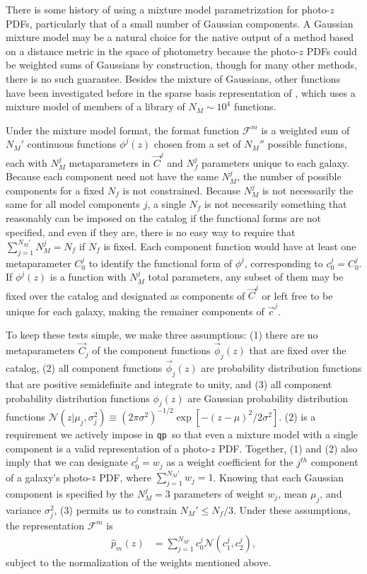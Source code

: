 \documentclass[\docopts]{\docclass}
\newcommand{\qp}{\texttt{qp}}
\newcommand{\pz}{photo-$z$ PDF}
\begin{document}
There is some history of using a mixture model parametrization for \pz s, 
particularly that of a small number of Gaussian components.
A Gaussian mixture model may be a natural choice for the native output of a 
method based on a distance metric in the space of photometry because the \pz s 
could be weighted sums of Gaussians by construction, though for many other 
methods, there is no such guarantee.  Besides the mixture of Gaussians, other 
functions have been investigated before in the sparse basis representation of 
\citet{carrasco_kind_sparse_2014}, which uses a mixture model of members of a 
library of $N_{M}\sim10^{4}$ functions.

Under the mixture model format, the format function $\mathcal{F}^{m}$ is a 
weighted sum of $N_{M}'$ continuous functions $\phi^{j}(z)$ chosen from a set 
of $N_{M}''$ possible functions, each with $N_{M}^{j}$ metaparameters in 
$\vec{C}^{j}$ and $N_{f}^{j}$ parameters unique to each galaxy.  Because each 
component need not have the same $N_{M}^{j}$, the number of possible components 
for a fixed $N_{f}$ is not constrained.  Because $N_{M}^{j}$ is not necessarily 
the same for all model components $j$, a single $N_{f}$ is not necessarily 
something that reasonably can be imposed on the catalog if the functional forms 
are not specified, and even if they are, there is no easy way to require that 
$\sum_{j=1}^{N_{M}'}N_{M}^{j}=N_{f}$ if $N_{f}$ is fixed.  Each component 
function would have at least one metaparameter $C_{0}^{j}$ to identify the 
functional form of $\phi^{j}$, corresponding to $c_{0}^{j}=C_{0}^{j}$.  If 
$\phi^{j}(z)$ is a function with $N_{M}^{j}$ total parameters, any subset of 
them may be fixed over the catalog and designated as components of 
$\vec{C}^{j}$ or left free to be unique for each galaxy, making the remainer 
components of $\vec{c}^{j}$.

To keep these tests simple, we make three assumptions: (1) there are no 
metaparameters $\vec{C}_{j}$ of the component functions $\vec{\phi}_{j}(z)$ 
that are fixed over the catalog, (2) all component functions 
$\vec{\phi}_{j}(z)$ are probability distribution functions that are positive 
semidefinite and integrate to unity, and (3) all component probability 
distribution functions $\phi_{j}(z)$ are Gaussian probability distribution 
functions $\mathcal{N}(z | 
\mu_{j},\sigma^{2}_{j})\equiv(2\pi\sigma^{2})^{-1/2}\exp[-(z-\mu)^{2}/2\sigma^{2
}]$.  (2) is a requirement we actively impose in \qp\ so that even a mixture 
model with a single component is a valid representation of a \pz.  Together, 
(1) and (2) also imply that we can designate $c_{0}^{j}=w_{j}$ as a weight 
coefficient for the $j^{th}$ component of a galaxy's \pz, where 
$\sum_{j=1}^{N_{M}'}w_{j}=1$.  Knowing that each Gaussian component is 
specified by the $N_{M}^{j}=3$ parameters of weight $w_{j}$, mean $\mu_{j}$, 
and variance $\sigma^{2}_{j}$, (3) permits us to constrain $N_{M}'\leq 
N_{f}/3$.  Under these assumptions, the representation $\mathcal{F}^{m}$ is
\begin{align}
  \label{eq:gmm}
  \hat{p}_{m}(z) &= \sum_{j=1}^{N_{M'}} c_{0}^{j} \mathcal{N}(c_{1}^{j}, 
c_{2}^{j}),
\end{align}
subject to the normalization of the weights mentioned above.
\end{document}

